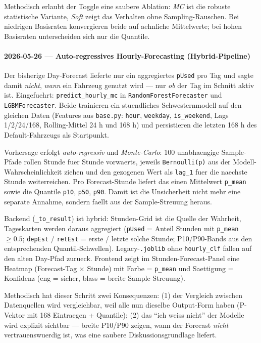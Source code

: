 Methodisch erlaubt der Toggle eine saubere Ablation: \emph{MC} ist die
robuste statistische Variante, \emph{Soft} zeigt das Verhalten ohne
Sampling-Rauschen. Bei niedrigen Basisraten konvergieren beide auf
aehnliche Mittelwerte; bei hohen Basisraten unterscheiden sich nur die
Quantile.

\paragraph{2026-05-26 --- Auto-regressives Hourly-Forecasting (Hybrid-Pipeline)}
Der bisherige Day-Forecast lieferte nur ein aggregiertes \texttt{pUsed} pro
Tag und sagte damit \emph{nicht}, \emph{wann} ein Fahrzeug genutzt wird ---
nur \emph{ob} der Tag im Schnitt aktiv ist. Eingefuehrt:
\texttt{predict\_hourly\_mc} in \texttt{RandomForestForecaster} und
\texttt{LGBMForecaster}. Beide trainieren ein stuendliches
Schwesternmodell auf den gleichen Daten (Features aus \texttt{base.py}:
\texttt{hour}, \texttt{weekday}, \texttt{is\_weekend}, Lags 1/2/24/168,
Rolling-Mittel 24 h und 168 h) und persistieren die letzten 168 h des
Default-Fahrzeugs als Startpunkt.

Vorhersage erfolgt \emph{auto-regressiv} und \emph{Monte-Carlo}: 100
unabhaengige Sample-Pfade rollen Stunde fuer Stunde vorwaerts, jeweils
\texttt{Bernoulli(p)} aus der Modell-Wahrscheinlichkeit ziehen und den
gezogenen Wert als \texttt{lag\_1} fuer die naechste Stunde
weiterreichen. Pro Forecast-Stunde liefert das einen Mittelwert
\texttt{p\_mean} sowie die Quantile \texttt{p10}, \texttt{p50},
\texttt{p90}. Damit ist die Unsicherheit nicht mehr eine separate
Annahme, sondern faellt aus der Sample-Streuung heraus.

Backend (\texttt{\_to\_result}) ist hybrid: Stunden-Grid ist die Quelle der
Wahrheit, Tageskarten werden daraus aggregiert (\texttt{pUsed} = Anteil
Stunden mit \texttt{p\_mean $\geq 0.5$}; \texttt{depEst} / \texttt{retEst}
= erste / letzte solche Stunde; P10/P90-Bands aus den entsprechenden
Quantil-Schwellen). Legacy-\texttt{.joblib} ohne \texttt{hourly\_clf}
fallen auf den alten Day-Pfad zurueck. Frontend zeigt im
Stunden-Forecast-Panel eine Heatmap (Forecast-Tag $\times$ Stunde) mit
Farbe = \texttt{p\_mean} und Saettigung = Konfidenz (eng = sicher, blass =
breite Sample-Streuung).

Methodisch hat dieser Schritt zwei Konsequenzen: (1) der Vergleich
zwischen Datenquellen wird vergleichbar, weil alle nun dieselbe
Output-Form haben (P-Vektor mit 168 Eintraegen + Quantile); (2) das
``ich weiss nicht'' der Modelle wird explizit sichtbar --- breite P10/P90
zeigen, wann der Forecast \emph{nicht} vertrauenswuerdig ist, was eine
saubere Diskussionsgrundlage liefert.

